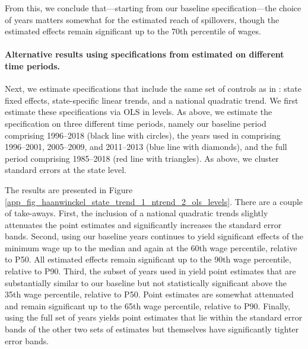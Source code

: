 From this, we conclude that---starting from our baseline specification---the choice of years matters somewhat for the estimated reach of spillovers, though the estimated effects remain significant up to the 70th percentile of wages.




\paragraph{Alternative results using specifications from \citet{Haanwinckel2020_appendix} estimated on different time periods.}

Next, we estimate specifications that include the same set of controls as in : state fixed effects, state-specific linear trends, and a national quadratic trend. We first estimate these specifications via OLS in levels. As above, we estimate the specification on three different time periods, namely our baseline period comprising 1996--2018 (black line with circles), the years used in  comprising 1996--2001, 2005--2009, and 2011--2013 (blue line with diamonds), and the full period comprising 1985--2018 (red line with triangles). As above, we cluster standard errors at the state level.

The results are presented in Figure \ref{app_fig_haanwinckel_state_trend_1_ntrend_2_ols_levels}. There are a couple of take-aways. First, the inclusion of a national quadratic trends slightly attenuates the point estimates and significantly increases the standard error bands. Second, using our baseline years continues to yield significant effects of the minimum wage up to the median and again at the 60th wage percentile, relative to P50. All estimated effects remain significant up to the 90th wage percentile, relative to P90. Third, the subset of years used in  yield point estimates that are substantially similar to our baseline but not statistically significant above the 35th wage percentile, relative to P50. Point estimates are somewhat attenuated and remain significant up to the 65th wage percentile, relative to P90. Finally, using the full set of years yields point estimates that lie within the standard error bands of the other two sets of estimates but themselves have significantly tighter error bands.


